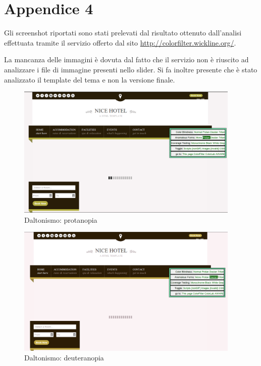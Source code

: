 \documentclass[a4paper,12pt,hidelinks]{report}
\begin{document}
\section{Appendice 4}
\label{sec:appendice4}
Gli screenshot riportati sono stati prelevati dal risultato ottenuto dall'analisi effettuata tramite il servizio offerto dal sito \url{http://colorfilter.wickline.org/}. 
\par La mancanza delle immagini è dovuta dal fatto che il servizio non è riuscito ad analizzare i file di immagine presenti nello slider. Si fa inoltre presente che è stato 
analizzato il template del tema e non la versione finale.
\begin{figure}[h!]%
  \includegraphics[width=0.95\textwidth,keepaspectratio=true]{../img/daltonismoProtanopia}
  \centering
  \caption{Daltonismo: protanopia}%
  \label{fig:daltonismoProtanopia}%
\end{figure}

\begin{figure}[h!]%
  \includegraphics[width=0.95\textwidth,keepaspectratio=true]{../img/daltonismoDeuteranopia}
  \centering
  \caption{Daltonismo: deuteranopia}%
  \label{fig:daltonismoDeuteranopia}%
\end{figure}
\end{document}

